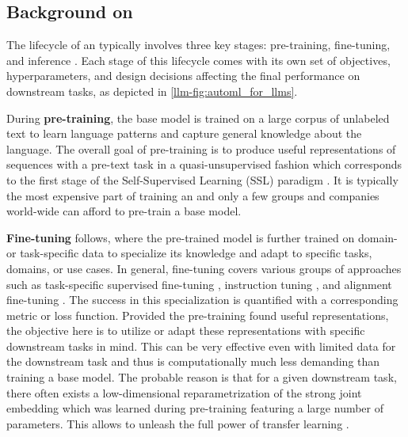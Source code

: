 \subsection{Background on \LLMs}

The lifecycle of an \LLM typically involves three key stages: pre-training, fine-tuning, and inference \cite{zhao-arxiv23a}. Each stage of this lifecycle comes with its own set of objectives, hyperparameters, and design decisions affecting the final performance on downstream tasks, as depicted in \autoref{llm-fig:automl_for_llms}.

During \textbf{pre-training}, the base model is trained on a large corpus of unlabeled text to learn language patterns and capture general knowledge about the language. The overall goal of pre-training is to produce useful representations of sequences with a pre-text task in a quasi-unsupervised fashion which corresponds to the first stage of the Self-Supervised Learning (SSL) paradigm \cite{balestriero-arxiv23a}. 
It is typically the most expensive part of training an \LLM and only a few groups and companies world-wide can afford to pre-train a base model.

\textbf{Fine-tuning} follows, where the pre-trained model is further trained on domain- or task-specific data to specialize its knowledge and adapt to specific tasks,  domains, or use cases. In general, fine-tuning covers various groups of approaches such as task-specific supervised fine-tuning \cite{zhao-arxiv23a}, instruction tuning \cite{wei-iclr22a}, and alignment fine-tuning \cite{zhao-arxiv23a}. 
The success in this specialization is quantified with a corresponding metric or loss function. 
Provided the pre-training found useful representations, the objective here is to utilize or adapt these representations with specific downstream tasks in mind.
This can be very effective even with limited data for the downstream task and thus is computationally much less demanding than training a base model.
The probable reason is that for a given downstream task, there often exists a low-dimensional reparametrization of the strong joint embedding which was learned during pre-training featuring a large number of parameters. This allows to unleash the full power of transfer learning \cite{aghajanyan-acl21}.

